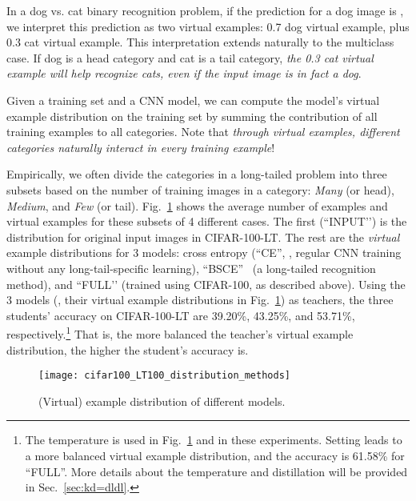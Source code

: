 \documentclass[10pt,twocolumn,letterpaper]{article}
\begin{document}
In a dog vs. cat binary recognition problem, if the prediction for a dog image is , we interpret this prediction as two virtual examples: 0.7 dog virtual example, plus 0.3 cat virtual example. This interpretation extends naturally to the multiclass case. If dog is a head category and cat is a tail category, \emph{the 0.3 cat virtual example will help recognize cats, even if the input image is in fact a dog}.

Given a training set and a CNN model, we can compute the model’s virtual example distribution on the training set by summing the contribution of all training examples to all categories. Note that \emph{through virtual examples, different categories naturally interact in \emph{every} training example}! 

Empirically, we often divide the categories in a long-tailed problem into three subsets based on the number of training images in a category: \emph{Many} (or head), \emph{Medium}, and \emph{Few} (or tail). Fig.~\ref{fig:motivation} shows the average number of examples and virtual examples for these subsets of 4 different cases. The first (``INPUT’’) is the distribution for original input images in CIFAR-100-LT. The rest are the \emph{virtual} example distributions for 3 models: cross entropy (``CE'', \ie, regular CNN training without any long-tail-specific learning), ``BSCE''~\cite{ren2020BALMS} (a long-tailed recognition method), and ``FULL’’ (trained using CIFAR-100, as described above). Using the 3 models (\ie, their virtual example distributions in Fig.~\ref{fig:motivation}) as teachers, the three students' accuracy on CIFAR-100-LT are 39.20\%, 43.25\%, and 53.71\%, respectively.\footnote{The temperature  is used in Fig.~\ref{fig:motivation} and in these experiments. Setting  leads to a more balanced virtual example distribution, and the accuracy is 61.58\% for ``FULL''. More details about the temperature and distillation will be provided in Sec.~\ref{sec:kd=dldl}.} That is, the more balanced the teacher's virtual example distribution, the higher the student's accuracy is.

\begin{figure}
   \centering
   \texttt{[image: cifar100\_LT100\_distribution\_methods]}
   \caption{(Virtual) example  distribution of different models.}
   \label{fig:motivation}
\end{figure}
\end{document}
